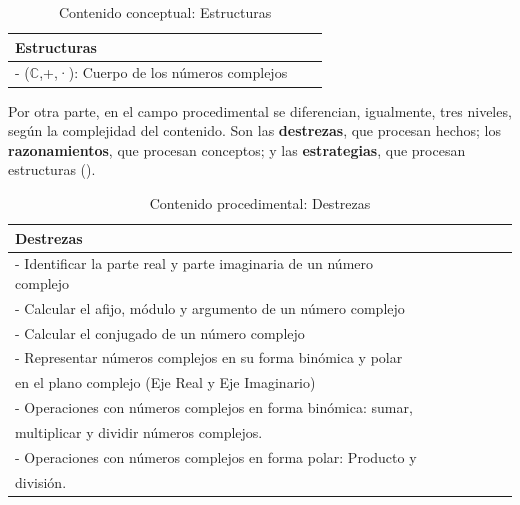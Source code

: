 \documentclass[../main.tex]{memoir}
\begin{document}
\begin{table}[H]
	\centering
	\begin{tabular}{lcc}
		\toprule
		\hspace{2.5cm}Estructuras \\
		\midrule
		 - ($\mathbb{C}$,+,·): Cuerpo de los números complejos \\
		\bottomrule
	\end{tabular}
	\caption{Contenido conceptual: Estructuras}
	\label{tab:estructuras}
\end{table}



Por otra parte, en el campo procedimental se diferencian, igualmente, tres niveles, según la complejidad del contenido. Son las \textbf{destrezas}, que procesan hechos; los \textbf{razonamientos}, que procesan conceptos; y las \textbf{estrategias}, que procesan estructuras (\cite{rico2016}). \\

\begin{table}[H]
	\centering
	\begin{tabular}{lcccccc}
		\toprule
		\hspace{5cm}Destrezas \\
		\midrule
		- Identificar la parte real y parte imaginaria de un número complejo \\
		- Calcular el afijo, módulo y argumento de un número complejo \\
		- Calcular el conjugado de un número complejo \\
		- Representar números complejos en su forma binómica y polar\\
		\hspace{0.2cm} en el plano complejo (Eje Real y Eje Imaginario) \\
		- Operaciones con números complejos en forma binómica: sumar, \\ \hspace{0.2cm}multiplicar y dividir números complejos. \\
		- Operaciones con números complejos en forma polar: Producto y \\
		\hspace{0.2cm}división. \\
		\bottomrule
	\end{tabular}
	\caption{Contenido procedimental: Destrezas}
	\label{tab:destrezas}
\end{table}
\end{document}

